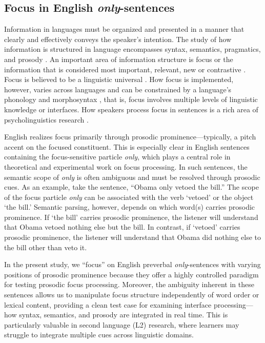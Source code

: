 \subsection{Focus in English \textit{only}-sentences}

Information in languages must be organized and presented in a manner that clearly and effectively conveys the speaker's intention. The study of how information is structured in language encompasses syntax, semantics, pragmatics, and prosody \parencite[see ][] {Breen2010, Lambrecht1994, Roberts2012}. An important area of information structure is focus or the information that is considered most important, relevant, new or contrastive \parencite{Kiss1998}. Focus is believed to be a linguistic universal \parencite{Comrie1989}. How focus is implemented, however, varies across languages and can be constrained by a language’s phonology and morphosyntax \parencite{Kiss1998, Lambrecht1994}, that is, focus involves multiple levels of linguistic knowledge or interfaces. How speakers process focus in sentences is a rich area of psycholinguistics research \parencite[e.g.,][] {Cutler1979, Filik2005, Wang2011}. 

English realizes focus primarily through prosodic prominence—typically, a pitch accent on the focused constituent. This is especially clear in English sentences containing the focus-sensitive particle \textit{only}, which plays a central role in theoretical and experimental work on focus processing. In such sentences, the semantic scope of \textit{only} is often ambiguous and must be resolved through prosodic cues.  As an example, take the sentence, “Obama only vetoed the bill.” The scope of the focus particle \textit{only} can be associated with the verb ‘vetoed’ or the object ‘the bill.’ Semantic parsing, however, depends on which word(s) carries prosodic prominence. If ‘the bill’ carries prosodic prominence, the listener will understand that Obama vetoed nothing else but the bill. In contrast, if ‘vetoed’ carries prosodic prominence, the listener will understand that Obama did nothing else to the bill other than veto it.

In the present study, we “focus” on English preverbal \textit{only}-sentences with varying positions of prosodic prominence because they offer a highly controlled paradigm for testing prosodic focus processing. Moreover, the ambiguity inherent in these sentences allows us to manipulate focus structure independently of word order or lexical content, providing a clean test case for examining interface processing—how syntax, semantics, and prosody are integrated in real time. This is particularly valuable in second language (L2) research, where learners may struggle to integrate multiple cues across linguistic domains.

